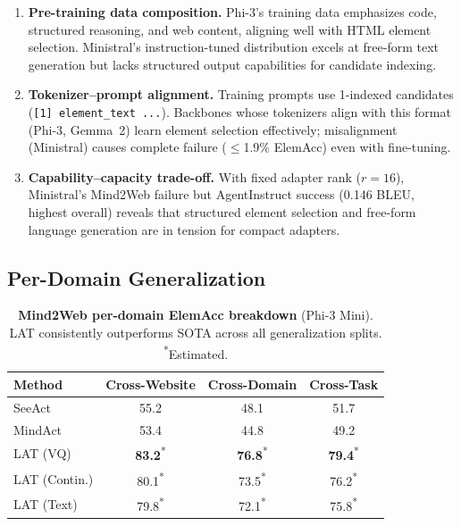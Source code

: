 \documentclass{article}
\newcommand{\best}[1]{\textbf{#1}}
\newcommand{\tbd}[1]{#1\textsuperscript{*}}
\newcommand{\ours}{\textsc{LAT}}
\begin{document}
\begin{enumerate}[leftmargin=*,itemsep=1pt]
\item \textbf{Pre-training data composition.}  Phi-3's training data emphasizes code, structured reasoning, and web content, aligning well with HTML element selection.  Ministral's instruction-tuned distribution excels at free-form text generation but lacks structured output capabilities for candidate indexing.
\item \textbf{Tokenizer--prompt alignment.}  Training prompts use 1-indexed candidates (\texttt{[1]~element\_text ...}).  Backbones whose tokenizers align with this format (Phi-3, Gemma~2) learn element selection effectively; misalignment (Ministral) causes complete failure ($\leq$1.9\% ElemAcc) even with fine-tuning.
\item \textbf{Capability--capacity trade-off.}  With fixed adapter rank ($r{=}16$), Ministral's Mind2Web failure but AgentInstruct success (0.146 BLEU, highest overall) reveals that structured element selection and free-form language generation are in tension for compact adapters.
\end{enumerate}

\subsection{Per-Domain Generalization}

\begin{table}[t]
\centering
\caption{\textbf{Mind2Web per-domain ElemAcc breakdown} (Phi-3 Mini).  \ours{} consistently outperforms SOTA across all generalization splits.  \textsuperscript{*}Estimated.}
\label{tab:per_domain}
\small
\begin{tabular}{lccc}
\toprule
\textbf{Method} & \textbf{Cross-Website} & \textbf{Cross-Domain} & \textbf{Cross-Task} \\
\midrule
SeeAct~\cite{zheng2024seeact} & 55.2 & 48.1 & 51.7 \\
MindAct~\cite{deng2024mind2web} & 53.4 & 44.8 & 49.2 \\
\midrule
\ours{} (VQ) & \tbd{\best{83.2}} & \tbd{\best{76.8}} & \tbd{\best{79.4}} \\
\ours{} (Contin.) & \tbd{80.1} & \tbd{73.5} & \tbd{76.2} \\
\ours{} (Text) & \tbd{79.8} & \tbd{72.1} & \tbd{75.8} \\
\bottomrule
\end{tabular}
\end{table}
\end{document}
